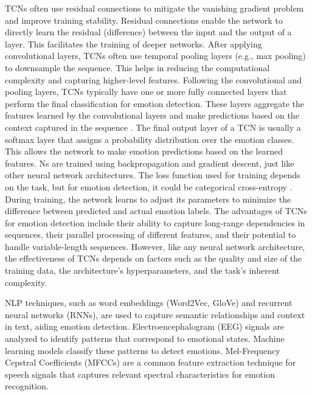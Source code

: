 \documentclass[conference]{IEEEtran}
\begin{document}
TCNs often use residual connections to mitigate the vanishing gradient problem and improve training stability. Residual connections enable the network to directly learn the residual (difference) between the input and the output of a layer. This facilitates the training of deeper networks. After applying convolutional layers, TCNs often use temporal pooling layers (e.g., max pooling) to downsample the sequence. This helps in reducing the computational complexity and capturing higher-level features. Following the convolutional and pooling layers, TCNs typically have one or more fully connected layers that perform the final classification for emotion detection. These layers aggregate the features learned by the convolutional layers and make predictions based on the context captured in the sequence \cite{zheng2023two}. The final output layer of a TCN is usually a softmax layer that assigns a probability distribution over the emotion classes. This allows the network to make emotion predictions based on the learned features. Ns are trained using backpropagation and gradient descent, just like other neural network architectures. The loss function used for training depends on the task, but for emotion detection, it could be categorical cross-entropy \cite{hu2023multiscale}. During training, the network learns to adjust its parameters to minimize the difference between predicted and actual emotion labels. The advantages of TCNs for emotion detection include their ability to capture long-range dependencies in sequences, their parallel processing of different features, and their potential to handle variable-length sequences. However, like any neural network architecture, the effectiveness of TCNs depends on factors such as the quality and size of the training data, the architecture's hyperparameters, and the task's inherent complexity.

 NLP techniques, such as word embeddings (Word2Vec, GloVe) and recurrent neural networks (RNNs), are used to capture semantic relationships and context in text, aiding emotion detection.
 Electroencephalogram (EEG) signals are analyzed to identify patterns that correspond to emotional states. Machine learning models classify these patterns to detect emotions. Mel-Frequency Cepstral Coefficients (MFCCs) are a common feature extraction technique for speech signals that captures relevant spectral characteristics for emotion recognition.
\end{document}
